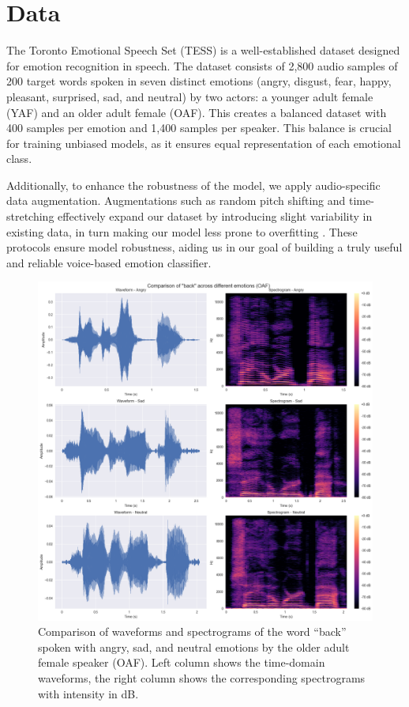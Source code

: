\documentclass[../main.tex]{subfiles}
\begin{document}
\section{Data}
The Toronto Emotional Speech Set (TESS) is a well-established dataset
designed for emotion recognition in speech. The dataset consists of 2,800
audio samples of 200 target words spoken in seven distinct emotions
(angry, disgust, fear, happy, pleasant, surprised, sad, and neutral)
by two actors: a younger adult female (YAF) and an older adult female (OAF).
This creates a balanced dataset with 400 samples per emotion and 1,400
samples per speaker. This balance is crucial for training unbiased models,
as it ensures equal representation of each emotional class.

Additionally, to enhance the robustness of the model, we apply audio-specific
data augmentation. Augmentations such as random pitch shifting and
time-stretching effectively expand our dataset by introducing slight variability
in existing data, in turn making our model less prone to overfitting 
\citep{Bhatlawande2024}. These protocols ensure model robustness, aiding us in 
our goal of building a truly useful and reliable voice-based emotion classifier.

\begin{figure}[h]
    \centering
    \includegraphics[width= 350pt]{../resources/tess_analysis.png}
    \caption{Comparison of waveforms and spectrograms of the word 
    ``back'' spoken with angry, sad, and neutral emotions by the older adult 
    female speaker (OAF). Left column shows the time-domain waveforms, the 
    right column shows the corresponding spectrograms with intensity in dB.}
    \label{fig:analysis}
\end{figure}
\end{document}
